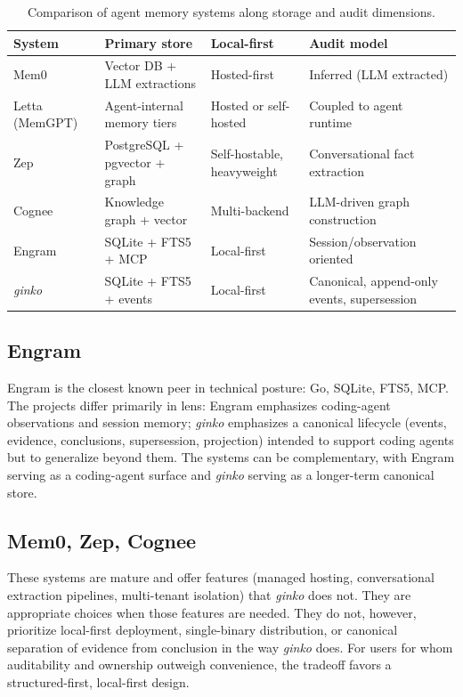 \documentclass[11pt,a4paper]{article}
\begin{document}
\begin{table}[h]
\centering
\small
\renewcommand{\arraystretch}{1.25}
\begin{tabularx}{\linewidth}{@{}lXXX@{}}
\toprule
\textbf{System} & \textbf{Primary store} & \textbf{Local-first} & \textbf{Audit model} \\
\midrule
Mem0~\cite{mem0} & Vector DB + LLM extractions & Hosted-first & Inferred (LLM extracted) \\
Letta (MemGPT)~\cite{packer2023memgpt} & Agent-internal memory tiers & Hosted or self-hosted & Coupled to agent runtime \\
Zep~\cite{zep} & PostgreSQL + pgvector + graph & Self-hostable, heavyweight & Conversational fact extraction \\
Cognee~\cite{cognee} & Knowledge graph + vector & Multi-backend & LLM-driven graph construction \\
Engram & SQLite + FTS5 + MCP & Local-first & Session/observation oriented \\
\textit{ginko}~\cite{ginkorepo} & SQLite + FTS5 + events & Local-first & Canonical, append-only events, supersession \\
\bottomrule
\end{tabularx}
\caption{Comparison of agent memory systems along storage and audit dimensions.}
\label{tab:comparison}
\end{table}

\subsection{Engram}

Engram is the closest known peer in technical posture: Go, SQLite, FTS5, MCP. The projects differ primarily in lens: Engram emphasizes coding-agent observations and session memory; \textit{ginko} emphasizes a canonical lifecycle (events, evidence, conclusions, supersession, projection) intended to support coding agents but to generalize beyond them. The systems can be complementary, with Engram serving as a coding-agent surface and \textit{ginko} serving as a longer-term canonical store.

\subsection{Mem0, Zep, Cognee}

These systems are mature and offer features (managed hosting, conversational extraction pipelines, multi-tenant isolation) that \textit{ginko} does not. They are appropriate choices when those features are needed. They do not, however, prioritize local-first deployment, single-binary distribution, or canonical separation of evidence from conclusion in the way \textit{ginko} does. For users for whom auditability and ownership outweigh convenience, the tradeoff favors a structured-first, local-first design.
\end{document}
